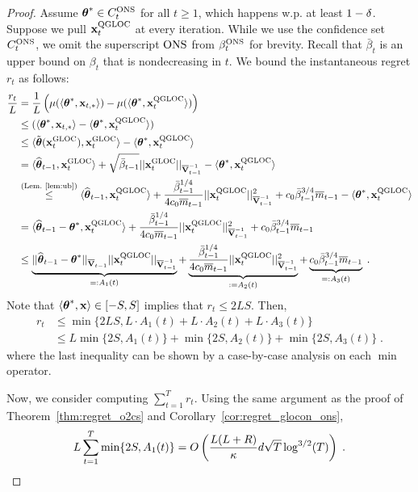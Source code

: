 \begin{proof}
Assume $\th^* \in C^{\ONS}_t$ for all $t\ge1$, which happens w.p. at least $1-\dt$.
Suppose we pull $\x_t^\QGLOC$ at every iteration.
While we use the confidence set $C^{\ONS}_t$, we omit the superscript $\ONS$ from $\beta^{\ONS}_t$ for brevity.
Recall that $\bar\beta_t$ is an upper bound on $\beta_t$ that is nondecreasing in $t$.
We bound the instantaneous regret $r_t$ as follows:
\begin{align*}
  \fr{r_t}{L}
&= \fr{1}{L} \lt(\mu(\la \th^*, \x_{t,*} \ra) - \mu(\la \th^*, \x_t^\QGLOC \ra)\rt) \\
&\le (\la \th^*, \x_{t,*} \ra - \la \th^*, \x_t^\QGLOC \ra) \\
&\le \la \tilth(\x_t^\GLOC), \x_{t}^\GLOC \ra - \la \th^*, \x_t^\QGLOC \ra \\
&= \la \hatth_{t-1}, \x_{t}^\GLOC \ra + \sqrt{\bar\beta_{t-1}} ||\x_{t}^\GLOC||_{\barV^{-1}_{t-1}} - \la \th^*, \x_t^\QGLOC \ra \\
&\stackrel{\text{(Lem.~\ref{lem:ub})}}{\le} \la \hatth_{t-1}, \x_t^\QGLOC \ra + \fr{\bar\beta_{t-1}^{1/4}}{4 c_0 \barm_{t-1}} { ||\x_t^\QGLOC||^2_{\barV^{-1}_{t-1}} } + c_0 \bar\beta_{t-1}^{3/4} \barm_{t-1}  - \la \th^*, \x_t^\QGLOC \ra \\
&= \la \hatth_{t-1} - \th^*, \x_t^\QGLOC \ra + \fr{\bar\beta_{t-1}^{1/4}}{4 c_0 \barm_{t-1}} { ||\x_t^\QGLOC||^2_{\barV^{-1}_{t-1}} } + c_0 \bar\beta_{t-1}^{3/4} \barm_{t-1}  \\
&\le \underbrace{||\hatth_{t-1} - \th^*||_{\barV_{t-1}} ||\x_t^\QGLOC||_{\barV^{-1}_{t-1}}}_{=: A_1(t)} + \underbrace{\fr{\bar\beta_{t-1}^{1/4}}{4 c_0 \barm_{t-1}} { ||\x_t^\QGLOC||^2_{\barV^{-1}_{t-1}} }}_{:= A_2(t)} + \underbrace{c_0 \bar\beta_{t-1}^{3/4} \barm_{t-1}}_{=: A_3(t)} \;.
\end{align*}
Note that $\la \th^*,\x \ra \in [-S,S]$ implies that $r_t \le 2LS$.
Then,
\begin{align*}
  r_t &\le \min\{2LS, L\cdot A_1(t) + L\cdot A_2(t) + L\cdot A_3(t) \} \\
      &\le L\min\{2S, A_1(t)\} + \min\{2S, A_2(t)\} + \min\{2S, A_3(t)\} \;.
\end{align*}
where the last inequality can be shown by a case-by-case analysis on each $\min$ operator.

Now, we consider computing $\sum_{t=1}^T r_t$.
Using the same argument as the proof of Theorem~\ref{thm:regret_o2cs} and Corollary~\ref{cor:regret_glocon_ons},
\begin{align*}
 L\sum_{t=1}^T \min\{2S, A_1(t)\} = O\lt(\fr{L(L+R)}{\kap}d\sqrt{T}\log^{3/2}(T)\rt)  \;.
\end{align*}


\end{proof}
